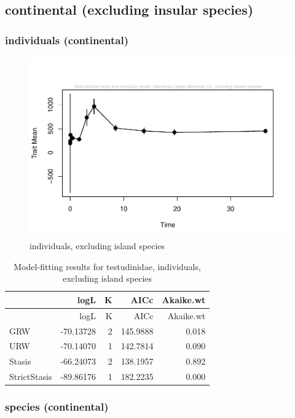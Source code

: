 \documentclass[]{article}
\begin{document}
\newpage

\subsection{continental (excluding insular
species)}\label{continental-excluding-insular-species}

\subsubsection{individuals (continental)}\label{individuals-continental}

\begin{figure}[htbp]
\centering
\includegraphics{MA_JJ_files/figure-latex/paleoTS, individuals, exluding island species-1.pdf}
\caption{individuals, excluding island species}
\end{figure}

\begin{longtable}[]{@{}lrrrr@{}}
\caption{Model-fitting results for testudinidae, individuals, excluding
island species}\tabularnewline
\toprule
& logL & K & AICc & Akaike.wt\tabularnewline
\midrule
\endfirsthead
\toprule
& logL & K & AICc & Akaike.wt\tabularnewline
\midrule
\endhead
GRW & -70.13728 & 2 & 145.9888 & 0.018\tabularnewline
URW & -70.14070 & 1 & 142.7814 & 0.090\tabularnewline
Stasis & -66.24073 & 2 & 138.1957 & 0.892\tabularnewline
StrictStasis & -89.86176 & 1 & 182.2235 & 0.000\tabularnewline
\bottomrule
\end{longtable}

\newpage

\subsubsection{species (continental)}\label{species-continental}
\end{document}
